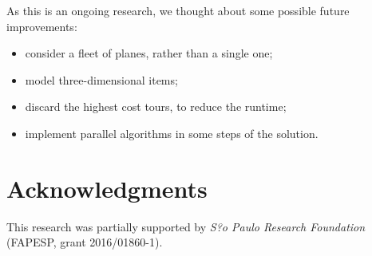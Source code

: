\documentclass[preprint]{elsarticle}
\begin{document}
As this is an ongoing research, we thought about some possible future improvements:
\begin{itemize}
\item consider a fleet of planes, rather than a single one;
\item model three-dimensional items;
\item discard the highest cost tours, to reduce the runtime;
\item implement parallel algorithms in some steps of the solution.
\end{itemize}


\section*{Acknowledgments}

This research was partially supported by \textit{S?o Paulo Research Foundation} (FAPESP, grant 2016/01860-1).
\end{document}
